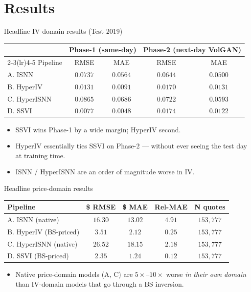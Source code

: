 \documentclass[10pt,aspectratio=169]{beamer}
\begin{document}
\section{Results}

\begin{frame}{Headline IV-domain results (Test 2019)}
\centering
\small
\begin{tabular}{lcccc}
\toprule
& \multicolumn{2}{c}{Phase-1 (same-day)} & \multicolumn{2}{c}{Phase-2 (next-day VolGAN)} \\
\cmidrule(lr){2-3}\cmidrule(lr){4-5}
Pipeline & RMSE & MAE & RMSE & MAE \\
\midrule
A. ISNN       & $0.0737$ & $0.0564$ & $0.0644$ & $0.0500$ \\
B. HyperIV    & $0.0131$ & $0.0091$ & $0.0170$ & $0.0131$ \\
C. HyperISNN  & $0.0865$ & $0.0686$ & $0.0722$ & $0.0593$ \\
D. SSVI       & $\mathbf{0.0077}$ & $\mathbf{0.0048}$ & $\mathbf{0.0174}$ & $\mathbf{0.0122}$ \\
\bottomrule
\end{tabular}
\medskip
\begin{itemize}\small
  \item SSVI wins Phase-1 by a wide margin; HyperIV second.
  \item HyperIV essentially ties SSVI on Phase-2 --- without ever seeing the test day at training time.
  \item ISNN / HyperISNN are an order of magnitude worse in IV.
\end{itemize}
\end{frame}

\begin{frame}{Headline price-domain results}
\centering
\small
\begin{tabular}{lcccc}
\toprule
Pipeline & \$ RMSE & \$ MAE & Rel-MAE & N quotes \\
\midrule
A. ISNN \scriptsize (native)        & $16.30$ & $13.02$ & $4.91$  & $153{,}777$ \\
B. HyperIV \scriptsize (BS-priced)  & $3.51$  & $2.12$  & $0.25$  & $153{,}777$ \\
C. HyperISNN \scriptsize (native)   & $26.52$ & $18.15$ & $2.18$  & $153{,}777$ \\
D. SSVI \scriptsize (BS-priced)     & $\mathbf{2.35}$  & $\mathbf{1.24}$  & $\mathbf{0.12}$  & $153{,}777$ \\
\bottomrule
\end{tabular}
\medskip
\begin{itemize}\small
  \item Native price-domain models (A, C) are $5\times$--$10\times$ worse \emph{in their own domain} than IV-domain models that go through a BS inversion.
\end{itemize}
\end{frame}
\end{document}
